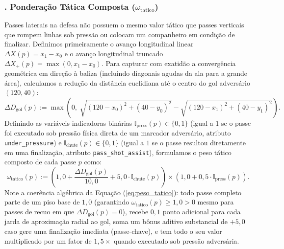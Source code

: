 \documentclass[10pt,a4paper]{article}
\theoremstyle{definition}
\theoremstyle{plain}
\theoremstyle{remark}
\begin{document}
\subsubsection*{. Ponderação Tática Composta (\texorpdfstring{$\omega_{\text{tatico}}$}{w\_tatico})}
Passes laterais na defesa não possuem o mesmo valor tático que passes verticais que rompem linhas sob pressão ou colocam um companheiro em condição de finalizar. Definimos primeiramente o avanço longitudinal linear $\Delta X(p) = x_1 - x_0$ e o avanço longitudinal truncado $\Delta X_{+}(p) = \max(0, x_1 - x_0)$. Para capturar com exatidão a convergência geométrica em direção à baliza (incluindo diagonais agudas da ala para a grande área), calculamos a redução da distância euclidiana até o centro do gol adversário $(120, 40)$:
\begin{equation}
\Delta D_{\text{gol}}(p) := \max\left(0, \; \sqrt{(120 - x_0)^2 + (40 - y_0)^2} - \sqrt{(120 - x_1)^2 + (40 - y_1)^2}\right).
\label{eq:ganho_proximidade}
\end{equation}
Definindo as variáveis indicadoras binárias $\mathbb{I}_{\text{press}}(p) \in \{0, 1\}$ (igual a $1$ se o passe foi executado sob pressão física direta de um marcador adversário, atributo \texttt{under\_pressure}) e $\mathbb{I}_{\text{chute}}(p) \in \{0, 1\}$ (igual a $1$ se o passe resultou diretamente em uma finalização, atributo \texttt{pass\_shot\_assist}), formulamos o peso tático composto de cada passe $p$ como:
\begin{equation}
\omega_{\text{tatico}}(p) := \left( 1{,}0 + \frac{\Delta D_{\text{gol}}(p)}{10{,}0} + 5{,}0 \cdot \mathbb{I}_{\text{chute}}(p) \right) \times \left( 1{,}0 + 0{,}5 \cdot \mathbb{I}_{\text{press}}(p) \right).
\label{eq:peso_tatico}
\end{equation}
Note a coerência algébrica da Equação (\ref{eq:peso_tatico}): todo passe completo parte de um piso base de $1{,}0$ (garantindo $\omega_{\text{tatico}}(p) \ge 1{,}0 > 0$ mesmo para passes de recuo em que $\Delta D_{\text{gol}}(p) = 0$), recebe $0{,}1$ ponto adicional para cada jarda de aproximação radial ao gol, soma um bônus aditivo substancial de $+5{,}0$ caso gere uma finalização imediata (passe-chave), e tem todo o seu valor multiplicado por um fator de $1{,}5\times$ quando executado sob pressão adversária.
\end{document}
